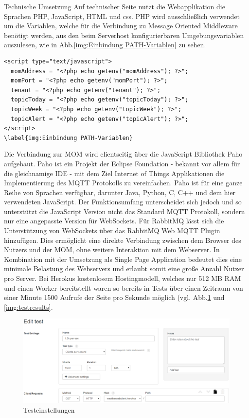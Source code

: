 Technische Umsetzung
Auf technischer Seite nutzt die Webapplikation die Sprachen PHP, JavaScript, HTML und css. PHP wird ausschließlich verwendet um die Variablen, welche für die Verbindung zu Message Oriented Middleware benötigt werden, aus den beim Serverhost konfigurierbaren Umgebungsvariablen auszulesen, wie in Abb.\ref{img:Einbindung PATH-Variablen} zu sehen.
\begin{lstlisting} 
<script type="text/javascript">
  momAddress = "<?php echo getenv("momAddress"); ?>";
  momPort = "<?php echo getenv("momPort"); ?>";
  tenant = "<?php echo getenv("tenant"); ?>";
  topicToday = "<?php echo getenv("topicToday"); ?>";
  topicWeek = "<?php echo getenv("topicWeek"); ?>";
  topicAlert = "<?php echo getenv("topicAlert"); ?>";
</script>
\label{img:Einbindung PATH-Variablen}
\end{lstlisting}
Die Verbindung zur MOM wird clientseitig über die JavaScript Bibliothek Paho aufgebaut. Paho ist ein Projekt der Eclipse Foundation - bekannt vor allem für die gleichnamige IDE - mit dem Ziel Internet of Things Applikationen die Implementierung des MQTT Protokolls zu vereinfachen. Paho ist für eine ganze Reihe von Sprachen verfügbar, darunter Java, Python, C, C++ und dem hier verwendeten JavaScript. Der Funktionsumfang unterscheidet sich jedoch und so unterstützt die JavaScript Version nicht das Standard MQTT Protokoll, sondern nur eine angepasste Version für WebSockets. Für RabbitMQ lässt sich die Unterstützung von WebSockets über das RabbitMQ Web MQTT Plugin hinzufügen. Dies ermöglicht eine direkte Verbindung zwischen dem Browser des Nutzers und der MOM, ohne weitere Interaktion mit dem Webserver.
In Kombination mit der Umsetzung als Single Page Application bedeutet dies eine minimale Belastung des Webservers und erlaubt somit eine große Anzahl Nutzer pro Server. Bei Herokus kostenlosem Hostingmodell, welches nur 512 MB RAM und einen Worker bereitstellt waren so bereits in Tests über einen Zeitraum von einer Minute 1500 Aufrufe der Seite pro Sekunde möglich (vgl. Abb.\ref{img:testsettings} und \ref{img:testresults}.
\begin{figure}[htbp]
	\centering
	\includegraphics[width=1.0\textwidth]{Bilder/Web-TestSettings.png}
	\caption{Testeinstellungen}
	\label{img:testsettings}
\end{figure}
